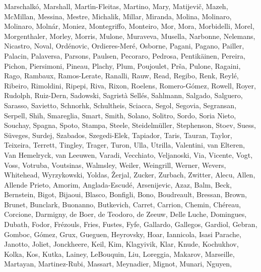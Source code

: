 \documentclass[onecolumn]{aa}
\begin{document}
\begin{thebibliography}{149}
{		{Marschalk{\'o}}, {Marshall}, {Mart{\'\i}n-Fleitas}, {Martino}, {Mary},
		{Matijevi{\v{c}}}, {Mazeh}, {McMillan}, {Messina}, {Mestre}, {Michalik},
		{Millar}, {Miranda}, {Molina}, {Molinaro}, {Molinaro}, {Moln{\'a}r},
		{Moniez}, {Montegriffo}, {Monteiro}, {Mor}, {Mora}, {Morbidelli}, {Morel},
		{Morgenthaler}, {Morley}, {Morris}, {Mulone}, {Muraveva}, {Musella},
		{Narbonne}, {Nelemans}, {Nicastro}, {Noval}, {Ord{\'e}novic},
		{Ordieres-Mer{\'e}}, {Osborne}, {Pagani}, {Pagano}, {Pailler}, {Palacin},
		{Palaversa}, {Parsons}, {Paulsen}, {Pecoraro}, {Pedrosa}, {Pentik{\"a}inen},
		{Pereira}, {Pichon}, {Piersimoni}, {Pineau}, {Plachy}, {Plum}, {Poujoulet},
		{Pr{\v{s}}a}, {Pulone}, {Ragaini}, {Rago}, {Rambaux}, {Ramos-Lerate},
		{Ranalli}, {Rauw}, {Read}, {Regibo}, {Renk}, {Reyl{\'e}}, {Ribeiro},
		{Rimoldini}, {Ripepi}, {Riva}, {Rixon}, {Roelens}, {Romero-G{\'o}mez},
		{Rowell}, {Royer}, {Rudolph}, {Ruiz-Dern}, {Sadowski}, {Sagrist{\`a}
			Sell{\'e}s}, {Sahlmann}, {Salgado}, {Salguero}, {Sarasso}, {Savietto},
		{Schnorhk}, {Schultheis}, {Sciacca}, {Segol}, {Segovia}, {Segransan},
		{Serpell}, {Shih}, {Smareglia}, {Smart}, {Smith}, {Solano}, {Solitro},
		{Sordo}, {Soria Nieto}, {Souchay}, {Spagna}, {Spoto}, {Stampa}, {Steele},
		{Steidelm{\"u}ller}, {Stephenson}, {Stoev}, {Suess}, {S{\"u}veges}, {Surdej},
		{Szabados}, {Szegedi-Elek}, {Tapiador}, {Taris}, {Tauran}, {Taylor},
		{Teixeira}, {Terrett}, {Tingley}, {Trager}, {Turon}, {Ulla}, {Utrilla},
		{Valentini}, {van Elteren}, {Van Hemelryck}, {van Leeuwen}, {Varadi},
		{Vecchiato}, {Veljanoski}, {Via}, {Vicente}, {Vogt}, {Voss}, {Votruba},
		{Voutsinas}, {Walmsley}, {Weiler}, {Weingrill}, {Werner}, {Wevers},
		{Whitehead}, {Wyrzykowski}, {Yoldas}, {{\v{Z}}erjal}, {Zucker}, {Zurbach},
		{Zwitter}, {Alecu}, {Allen}, {Allende Prieto}, {Amorim},
		{Anglada-Escud{\'e}}, {Arsenijevic}, {Azaz}, {Balm}, {Beck}, {Bernstein},
		{Bigot}, {Bijaoui}, {Blasco}, {Bonfigli}, {Bono}, {Boudreault}, {Bressan},
		{Brown}, {Brunet}, {Bunclark}, {Buonanno}, {Butkevich}, {Carret}, {Carrion},
		{Chemin}, {Ch{\'e}reau}, {Corcione}, {Darmigny}, {de Boer}, {de Teodoro}, {de
			Zeeuw}, {Delle Luche}, {Domingues}, {Dubath}, {Fodor}, {Fr{\'e}zouls},
		{Fries}, {Fustes}, {Fyfe}, {Gallardo}, {Gallegos}, {Gardiol}, {Gebran},
		{Gomboc}, {G{\'o}mez}, {Grux}, {Gueguen}, {Heyrovsky}, {Hoar}, {Iannicola},
		{Isasi Parache}, {Janotto}, {Joliet}, {Jonckheere}, {Keil}, {Kim},
		{Klagyivik}, {Klar}, {Knude}, {Kochukhov}, {Kolka}, {Kos}, {Kutka}, {Lainey},
		{LeBouquin}, {Liu}, {Loreggia}, {Makarov}, {Marseille}, {Martayan},
		{Martinez-Rubi}, {Massart}, {Meynadier}, {Mignot}, {Munari}, {Nguyen},
}
\end{thebibliography}
\end{document}
